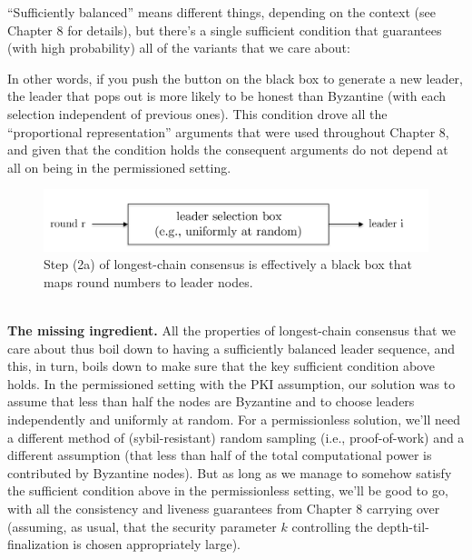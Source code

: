“Sufficiently balanced” means different things, depending on the context (see Chapter 8
for details), but there’s a single sufficient condition that guarantees (with high probability)
all of the variants that we care about:

In other words, if you push the button on the black box to generate a new leader, the leader
that pops out is more likely to be honest than Byzantine (with each selection independent
of previous ones). This condition drove all the “proportional representation” arguments
that were used throughout Chapter 8, and given that the condition holds the consequent
arguments do not depend at all on being in the permissioned setting.\\
\begin{figure}[h]
    \centering
    \includegraphics[scale = 0.5]{figures/f36.png}
    \caption{Step (2a) of longest-chain consensus is effectively a black box that maps round
numbers to leader nodes.}
    \label{fig:mesh1}
\end{figure}\\
\noindent
\textbf{The missing ingredient.} All the properties of longest-chain consensus that we care about
thus boil down to having a sufficiently balanced leader sequence, and this, in turn, boils down
to make sure that the key sufficient condition above holds. In the permissioned setting with
the PKI assumption, our solution was to assume that less than half the nodes are Byzantine
and to choose leaders independently and uniformly at random. For a permissionless solution,
we’ll need a different method of (sybil-resistant) random sampling (i.e., proof-of-work) and
a different assumption (that less than half of the total computational power is contributed
by Byzantine nodes). But as long as we manage to somehow satisfy the sufficient condition
above in the permissionless setting, we’ll be good to go, with all the consistency and liveness
guarantees from Chapter 8 carrying over (assuming, as usual, that the security parameter $k$
controlling the depth-til-finalization is chosen appropriately large).\\


